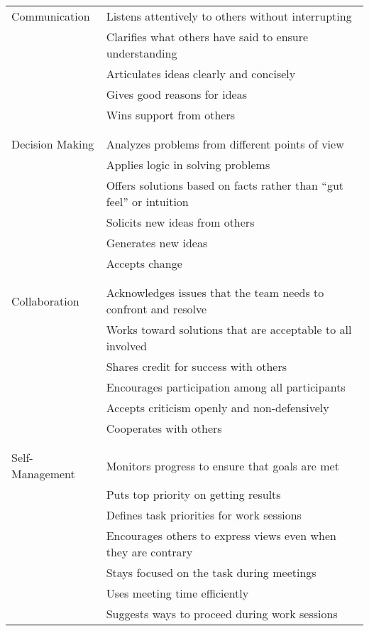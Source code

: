\noindent
\begin{longtable}{p{}p{}}

  Communication
  & Listens attentively to others without interrupting \\
  & Clarifies what others have said to ensure understanding \\
  & Articulates ideas clearly and concisely \\
  & Gives good reasons for ideas \\
  & Wins support from others \\
  \\ [-1.5ex] \hline \\ [-1.5ex]

  Decision Making
  & Analyzes problems from different points of view \\
  & Applies logic in solving problems \\
  & Offers solutions based on facts rather than ``gut feel'' or intuition \\
  & Solicits new ideas from others \\
  & Generates new ideas \\
  & Accepts change \\
  \\ [-1.5ex] \hline \\ [-1.5ex]

  Collaboration
  & Acknowledges issues that the team needs to confront and resolve \\
  & Works toward solutions that are acceptable to all involved \\
  & Shares credit for success with others \\
  & Encourages participation among all participants \\
  & Accepts criticism openly and non-defensively \\
  & Cooperates with others \\
  \\ [-1.5ex] \hline \\ [-1.5ex]

  Self-Management
  & Monitors progress to ensure that goals are met \\
  & Puts top priority on getting results \\
  & Defines task priorities for work sessions \\
  & Encourages others to express views even when they are contrary \\
  & Stays focused on the task during meetings \\
  & Uses meeting time efficiently \\
  & Suggests ways to proceed during work sessions \\

\end{longtable}

